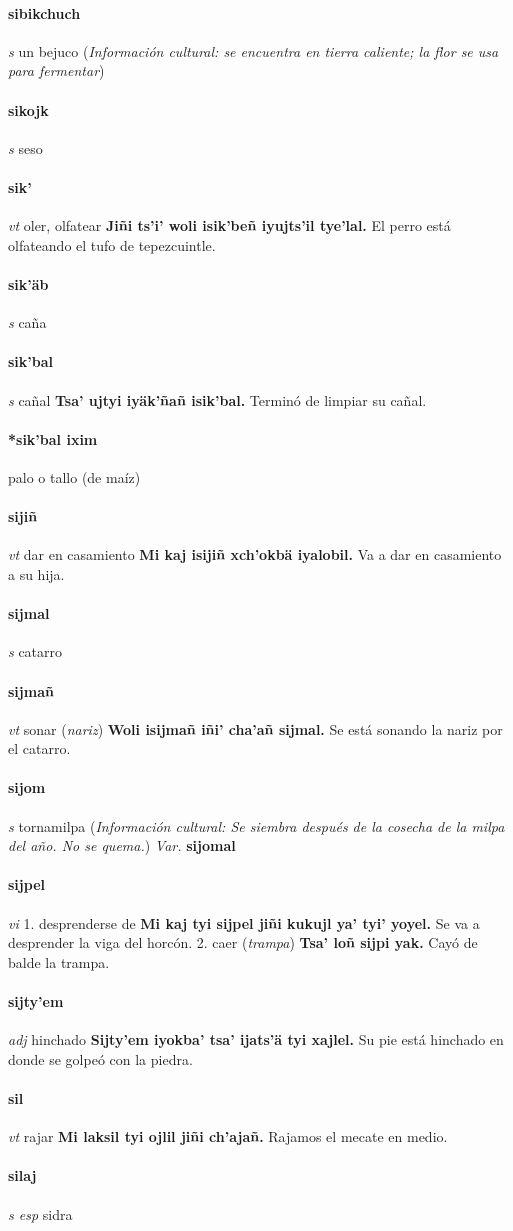 \documentclass{scrbook}
\newcommand{\entry}[1]{\paragraph{#1}}
\newcommand{\onedefinition}[1]{#1.}
\newcommand{\partofspeech}[1]{\textit{#1}}
\newcommand{\spanishtranslation}[1]{#1}
\newcommand{\clarification}[1]{(\textit{#1})}
\newcommand{\cholexample}[1]{\textbf{#1}}
\newcommand{\exampletranslation}[1]{#1}
\newcommand{\culturalinformation}[1]{(\textit{#1})}
\newcommand{\variation}[1]{\textit{Var.} \textbf{#1}}
\begin{document}
\begin{multicols}{2}
\entry{sibikchuch}
\partofspeech{s}
\spanishtranslation{un bejuco}
\culturalinformation{Información cultural: se encuentra en tierra caliente; la flor se usa para fermentar}

\entry{sikojk}
\partofspeech{s}
\spanishtranslation{seso}

\entry{sik'}
\partofspeech{vt}
\spanishtranslation{oler, olfatear}
\cholexample{Jiñi ts'i' woli isik'beñ iyujts'il tye'lal.}
\exampletranslation{El perro está olfateando el tufo de tepezcuintle.}

\entry{sik'äb}
\partofspeech{s}
\spanishtranslation{caña}

\entry{sik'bal}
\partofspeech{s}
\spanishtranslation{cañal}
\cholexample{Tsa' ujtyi iyäk'ñañ isik'bal.}
\exampletranslation{Terminó de limpiar su cañal.}

\entry{*sik'bal ixim}
\spanishtranslation{palo o tallo (de maíz)}

\entry{sijiñ}
\partofspeech{vt}
\spanishtranslation{dar en casamiento}
\cholexample{Mi kaj isijiñ xch'okbä iyalobil.}
\exampletranslation{Va a dar en casamiento a su hija.}

\entry{sijmal}
\partofspeech{s}
\spanishtranslation{catarro}

\entry{sijmañ}
\partofspeech{vt}
\spanishtranslation{sonar}
\clarification{nariz}
\cholexample{Woli isijmañ iñi' cha'añ sijmal.}
\exampletranslation{Se está sonando la nariz por el catarro.}

\entry{sijom}
\partofspeech{s}
\spanishtranslation{tornamilpa}
\culturalinformation{Información cultural: Se siembra después de la cosecha de la milpa del año. No se quema.}
\variation{sijomal}

\entry{sijpel}
\partofspeech{vi}
\onedefinition{1}
\spanishtranslation{desprenderse de}
\cholexample{Mi kaj tyi sijpel jiñi kukujl ya' tyi' yoyel.}
\exampletranslation{Se va a desprender la viga del horcón.}
\onedefinition{2}
\spanishtranslation{caer}
\clarification{trampa}
\cholexample{Tsa' loñ sijpi yak.}
\exampletranslation{Cayó de balde la trampa.}

\entry{sijty'em}
\partofspeech{adj}
\spanishtranslation{hinchado}
\cholexample{Sijty'em iyokba' tsa' ijats'ä tyi xajlel.}
\exampletranslation{Su pie está hinchado en donde se golpeó con la piedra.}

\entry{sil}
\partofspeech{vt}
\spanishtranslation{rajar}
\cholexample{Mi laksil tyi ojlil jiñi ch'ajañ.}
\exampletranslation{Rajamos el mecate en medio.}

\entry{silaj}
\partofspeech{s esp}
\spanishtranslation{sidra}


\end{multicols}
\end{document}
